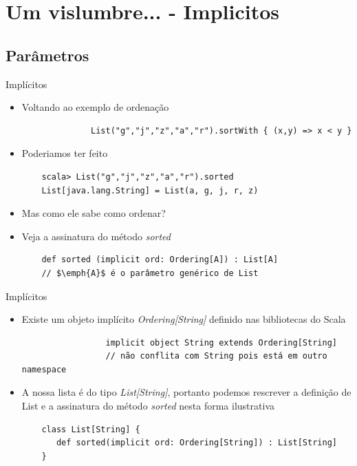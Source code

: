 \documentclass{beamer}
\begin{document}
\section{Um vislumbre... - Implicitos}

\subsection{Parâmetros}
\begin{frame}[fragile]{Implícitos} 
    \begin{itemize} [<+->]
	\item Voltando ao exemplo de ordenação
	\begin{lstlisting}
	          List("g","j","z","a","r").sortWith { (x,y) => x < y }
	\end{lstlisting}
	\item Poderiamos ter feito
	\begin{lstlisting}
	scala> List("g","j","z","a","r").sorted
	List[java.lang.String] = List(a, g, j, r, z)
	\end{lstlisting}
	\item<2-> Mas como ele sabe como ordenar?
	\item<3-> Veja a assinatura do método \emph{sorted}	
	\begin{lstlisting}
	def sorted (implicit ord: Ordering[A]) : List[A] 
	// $\emph{A}$ é o parâmetro genérico de List
	\end{lstlisting}
    \end{itemize}
\end{frame} 

\begin{frame}[fragile]{Implícitos} 
    \begin{itemize} [<+->]
	\item Existe um objeto implícito \emph{Ordering[String]} definido nas bibliotecas do Scala
	\begin{lstlisting}
	             implicit object String extends Ordering[String] 
	             // não conflita com String pois está em outro namespace
	\end{lstlisting}
	\item A nossa lista é do tipo \emph{List[String]}, portanto podemos rescrever a definição de List e a assinatura do método \emph{sorted} nesta forma ilustrativa 
	\begin{lstlisting}
	class List[String] {
	   def sorted(implicit ord: Ordering[String]) : List[String]
	}
	\end{lstlisting}
    \end{itemize}
\end{frame}
\end{document}
